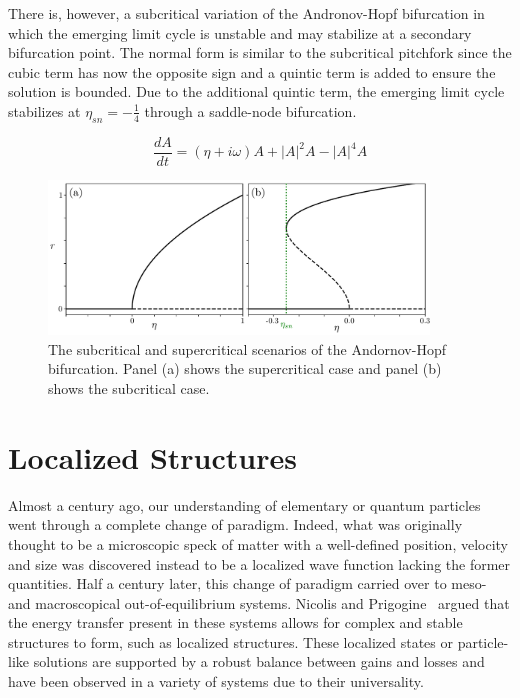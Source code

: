 There is, however, a subcritical variation
of the Andronov-Hopf bifurcation in which the emerging limit cycle is unstable and may stabilize at a secondary bifurcation point.
The normal form is similar to the subcritical pitchfork since the cubic term has now the opposite sign and a quintic term is added to ensure the solution is bounded.
Due to the additional quintic term, the emerging limit cycle stabilizes at $\eta_{sn} = -\frac14$ through
a saddle-node bifurcation.

\begin{equation}
    \dfrac{dA}{dt} = (\eta + i\omega) A + |A|^2 A - |A|^4A
\end{equation}

\begin{figure}[h]
    \centering
    \includegraphics[width=0.9\textwidth]{imagenes/framework/hopf_supersub.pdf}
    \caption{The subcritical and supercritical scenarios of the Andornov-Hopf
    bifurcation. Panel (a) shows the supercritical case and panel (b) shows the subcritical
    case.}
\end{figure}

\section{Localized Structures}
\label{sec:fra_LS}


Almost a century ago, our understanding of elementary or quantum particles went
through a complete change of paradigm. Indeed, what was originally thought
to be a microscopic speck of matter with a well-defined position, velocity and size
was discovered instead to be a localized wave function lacking the former quantities.
Half a century later, this change of paradigm carried over to meso- and macroscopical out-of-equilibrium
systems. Nicolis and Prigogine~\cite{prigogine1977self} argued that the energy transfer present in these systems
allows for complex and stable structures to form, such as localized structures. These localized states
or particle-like solutions are supported by a robust balance between gains and losses and have been observed in a
variety of systems due to their universality. 

